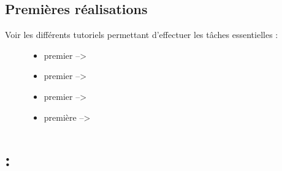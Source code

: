 \documentclass[a4paper,10pt,french]{sphinxmanual}
\begin{document}
\section{Premières réalisations}
\label{\detokenize{docs/refs/autocad-intro:premieres-realisations}}\begin{description}
\item[{Voir les différents tutoriels permettant d'effectuer les tâches essentielles :}] \leavevmode\begin{itemize}
\item {} 
premier   --\textgreater{}  

\item {} 
premier   --\textgreater{}  

\item {} 
premier  --\textgreater{}  

\item {} 
première  --\textgreater{}  

\end{itemize}

\end{description}


\chapter{ : }
\label{\detokenize{docs/refs/autocad-help::doc}}\label{\detokenize{docs/refs/autocad-help:autodesk}}\label{\detokenize{docs/refs/autocad-help:autocad-help}}\label{\detokenize{docs/refs/autocad-help:acad-help}}
\end{document}
